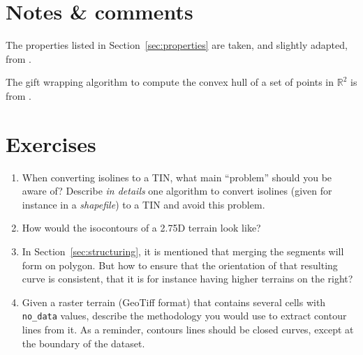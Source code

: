 \section{Notes \& comments}

The properties listed in Section~\ref{sec:properties} are taken, and slightly adapted, from \citet{Galton06}. 

The gift wrapping algorithm to compute the convex hull of a set of points in $\mathbb{R}^2$ is from \citet{Jarvis73}.


%
\section{Exercises}

\begin{enumerate}
  \item When converting isolines to a TIN, what main ``problem'' should you be aware of? Describe \emph{in details} one algorithm to convert isolines (given for instance in a \emph{shapefile}) to a TIN and avoid this problem.
  \item How would the isocontours of a 2.75D terrain look like?
  \item In Section~\ref{sec:structuring}, it is mentioned that merging the segments will form on polygon. But how to ensure that the orientation of that resulting curve is consistent, that it is for instance having higher terrains on the right?
  \item Given a raster terrain (GeoTiff format) that contains several cells with \texttt{no\_data} values, describe the methodology you would use to extract contour lines from it. As a reminder, contours lines should be closed curves, except at the boundary of the dataset.
\end{enumerate}